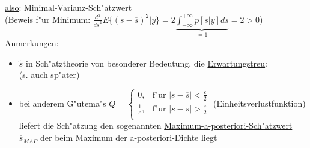 \documentclass[openany,a4paper,11pt]{book}
\begin{document}
\uline{also}:  \quad Minimal-Varianz-Sch"atzwert\\[3pt]
(Beweis f"ur Minimum: $\displaystyle\frac{d^2}{d\overline{s}^2}E\{(s-\overline{s})^2|y\}=2\underbrace{\int_{-\infty}^{+\infty}p[s|y]ds}_{=1}=2>0$)\\
\uline{Anmerkungen}:\begin{itemize}
    \item $\tilde{s}$ in Sch"atztheorie von besonderer Bedeutung, die \uline{Erwartungstreu}:\\
     \quad (s. auch sp"ater)
    \item bei anderem G"utema"s 
    $\displaystyle Q= \left \{%
        \begin{array}{ll}
          0, & \text{f"ur } |s-\overline{s}|<\frac{\varepsilon}{2}\\
          \frac{1}{\varepsilon}, & \text{f"ur } |s-\overline{s}|>\frac{\varepsilon}{2}\\
        \end{array} \right.$  \quad (Einheitsverlustfunktion)\\
        liefert die Sch"atzung den sogenannten \uline{Maximum-a-posteriori-Sch"atzwert} $\overline{s}_{MAP}$ der beim Maximum der a-posteriori-Dichte liegt
\end{itemize}
\end{document}

